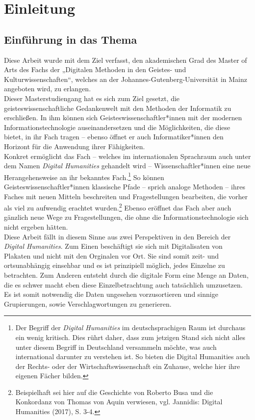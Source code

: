\documentclass[a4paper,12pt,ngerman]{article}
\begin{document}
\newpage

\thispagestyle{empty}
\tableofcontents

\newpage

\section{Einleitung}
\subsection{Einführung in das Thema}
Diese Arbeit wurde mit dem Ziel verfasst, den akademischen Grad des Master of Arts des Fachs der „Digitalen Methoden in den Geistes- und Kulturwissenschaften“, welches an der Johannes-Gutenberg-Universität in Mainz angeboten wird, zu erlangen. \\
Dieser Masterstudiengang hat es sich zum Ziel gesetzt, die geisteswissenschaftliche Gedankenwelt mit den Methoden der Informatik zu erschließen. In ihm können sich Geisteswissenschaftler*innen mit der modernen Informationstechnologie auseinandersetzen und die Möglichkeiten, die diese bietet, in ihr Fach tragen -- ebenso öffnet er auch Informatiker*innen den Horizont für die Anwendung ihrer Fähigkeiten. \\
Konkret ermöglicht das Fach -- welches im internationalen Sprachraum auch unter dem Namen \textit{Digital Humanities} gehandelt wird -- Wissenschaftler*innen eine neue Herangehensweise an ihr bekanntes Fach.\footnote{Der Begriff der \textit{Digital Humanities} im deutschsprachigen Raum ist durchaus ein wenig kritisch. Dies rührt daher, dass zum jetzigen Stand sich nicht alles unter diesem Begriff in Deutschland versammeln möchte, was auch international darunter zu verstehen ist. So bieten die Digital Humanities auch der Rechts- oder der Wirtschaftswissenschaft ein Zuhause, welche hier ihre eigenen Fächer bilden.}  So können Geisteswissenschaftler*innen klassische Pfade -- sprich analoge Methoden -- ihres Faches mit neuen Mitteln beschreiten und Fragestellungen bearbeiten, die vorher als viel zu aufwendig erachtet wurden.\footnote{Beispielhaft sei hier auf die Geschichte von Roberto Busa und die Konkordanz von Thomas von Aquin verwiesen, vgl. Jannidis: Digital Humanities (2017), S. 3-4.} Ebenso eröffnet das Fach aber auch gänzlich neue Wege zu Fragestellungen, die ohne die Informationstechnologie sich nicht ergeben hätten. \\
Diese Arbeit fällt in diesem Sinne aus zwei Perspektiven in den Bereich der \textit{Digital Humanities}. Zum Einen beschäftigt sie sich mit Digitalisaten von Plakaten und nicht mit den Orginalen vor Ort. Sie sind somit zeit- und ortsunabhängig einsehbar und es ist prinzipiell möglich, jedes Einzelne zu betrachten. Zum Anderen entsteht durch die digitale Form eine Menge an Daten, die es schwer macht eben diese Einzelbetrachtung auch tatsächlich umzusetzen. Es ist somit notwendig die Daten ungesehen vorzusortieren und sinnige Grupierungen, sowie Verschlagwortungen zu generieren. \\
\end{document}
